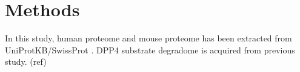 \section{Methods}
In this study, human proteome and mouse proteome has been extracted from UniProtKB/SwissProt \cite{2007}. 
DPP4 substrate degradome is acquired from previous study. (ref) 

